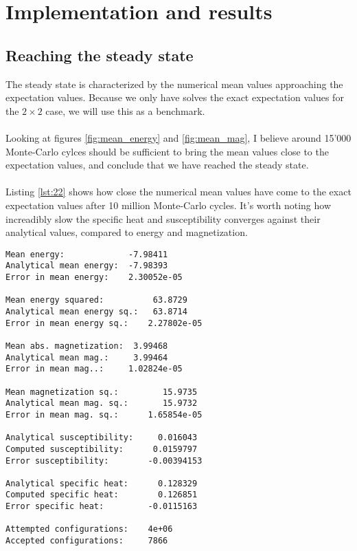 \documentclass[10pt,a4paper]{article}
\begin{document}
\section{Implementation and results}
\subsection{Reaching the steady state}\label{sec:22}
The steady state is characterized by the numerical mean values approaching the expectation values. Because we only have solves the exact expectation values for the $2\times 2$ case, we will use this as a benchmark.\\\\
Looking at figures \ref{fig:mean_energy} and \ref{fig:mean_mag}, I believe around 15'000 Monte-Carlo cylces should be sufficient to bring the mean values close to the expectation values, and conclude that we have reached the steady state.\\\\
Listing \ref{lst:22} shows how close the numerical mean values have come to the exact expectation values after 10 million Monte-Carlo cycles. It's worth noting how increadibly slow the specific heat and susceptibility converges against their analytical values, compared to energy and magnetization.

\begin{lstlisting}[basicstyle=\footnotesize, frame=single, caption = Mean values against expectation values after $10^7$ Monte-Carlo cycles on a $2\times 2$ lattice, label = lst:22]
Mean energy:             -7.98411
Analytical mean energy:  -7.98393
Error in mean energy:    2.30052e-05

Mean energy squared:          63.8729
Analytical mean energy sq.:   63.8714
Error in mean energy sq.:    2.27802e-05

Mean abs. magnetization:  3.99468
Analytical mean mag.:     3.99464
Error in mean mag..:     1.02824e-05

Mean magnetization sq.:         15.9735
Analytical mean mag. sq.:       15.9732
Error in mean mag. sq.:      1.65854e-05

Analytical susceptibility:     0.016043
Computed susceptibility:      0.0159797
Error susceptibility:        -0.00394153

Analytical specific heat:      0.128329
Computed specific heat:        0.126851
Error specific heat:         -0.0115163

Attempted configurations:    4e+06
Accepted configurations:     7866
\end{lstlisting}
\end{document}
